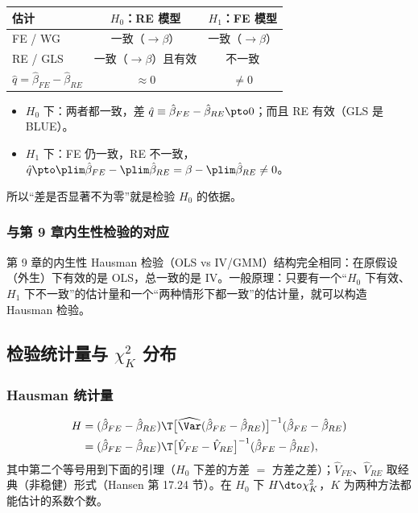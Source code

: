 \begin{center}\begin{minipage}{\linewidth}\centering
{}
\begin{tabularx}{0.85\linewidth}{lCC}
\toprule
估计 & $H_0$：RE 模型 & $H_1$：FE 模型\\
\midrule
FE / WG & 一致（$\to\beta$） & 一致（$\to\beta$）\\
RE / GLS & 一致（$\to\beta$）且有效 & 不一致\\
\midrule
$\hat q=\hat\beta_{FE}-\hat\beta_{RE}$ & $\approx0$ & $\neq0$\\
\bottomrule
\end{tabularx}
\end{minipage}\end{center}
\begin{itemize}
  \item $H_0$ 下：两者都一致，差 $\hat q\equiv\hat\beta_{FE}-\hat\beta_{RE}\pto0$；而且 RE 有效（GLS 是 BLUE）。
  \item $H_1$ 下：FE 仍一致，RE 不一致，$\hat q\pto\plim\hat\beta_{FE}-\plim\hat\beta_{RE}=\beta-\plim\hat\beta_{RE}\neq0$。
\end{itemize}
所以“差是否显著不为零”就是检验 $H_0$ 的依据。

\subsubsection{与第 9 章内生性检验的对应}

第 9 章的内生性 Hausman 检验（OLS vs IV/GMM）结构完全相同：在原假设（外生）下有效的是 OLS，总一致的是 IV。一般原理：只要有一个“$H_0$ 下有效、$H_1$ 下不一致”的估计量和一个“两种情形下都一致”的估计量，就可以构造 Hausman 检验。

\subsection{检验统计量与 \texorpdfstring{$\chi^2_K$}{chi2\_K} 分布}

\subsubsection{Hausman 统计量}

\begin{defn}\label{def:U11a-H}
\begin{align*}
H &= (\hat\beta_{FE}-\hat\beta_{RE})\T\big[\widehat{\Var}(\hat\beta_{FE}-\hat\beta_{RE})\big]^{-1}(\hat\beta_{FE}-\hat\beta_{RE})\\
&= (\hat\beta_{FE}-\hat\beta_{RE})\T\big[\hat V_{FE}-\hat V_{RE}\big]^{-1}(\hat\beta_{FE}-\hat\beta_{RE}),
\end{align*}
其中第二个等号用到下面的引理（$H_0$ 下差的方差 $=$ 方差之差）；$\hat V_{FE}$、$\hat V_{RE}$ 取经典（非稳健）形式（Hansen 第 17.24 节）。在 $H_0$ 下 $H\dto\chi^2_K$，$K$ 为两种方法都能估计的系数个数。
\end{defn}


